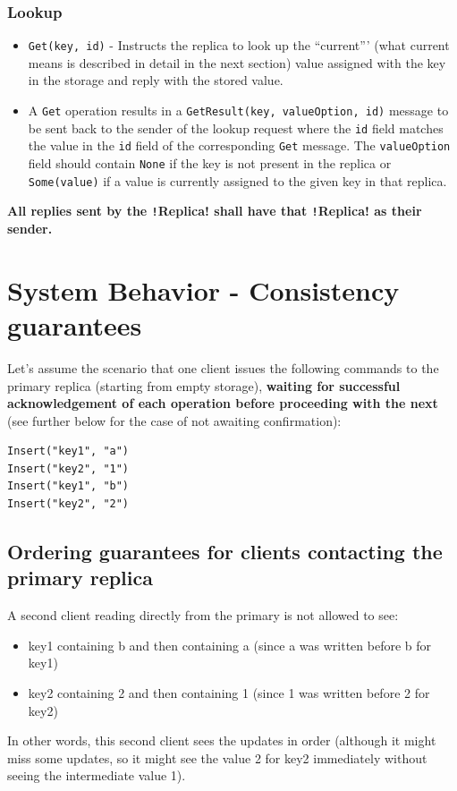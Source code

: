 \documentclass{article}
\begin{document}
 \subsubsection{Lookup} 
 \begin{itemize} 
	 \item \texttt{Get(key, id)} - Instructs the replica to look up the ``current''' (what current means is described in detail in the next section) value assigned with the key in the storage and reply with the stored value. 
	 \item 	 A \texttt{Get} operation results in a \texttt{GetResult(key, valueOption, id)} message to be sent back to the sender of the lookup request where the \texttt{id} field matches the value in the \texttt{id} field of the corresponding \texttt{Get} message. The \texttt{valueOption} field should contain \texttt{None} if the key is not present in the replica or \texttt{Some(value)} if a value is currently assigned to the given key in that replica. 
\end{itemize}
 \textbf{All replies sent by the \texttt!Replica! shall have that \texttt!Replica! as their sender.} 
\section{System Behavior - Consistency guarantees}\label{s:systembehavior}
Let's assume the scenario that one client issues the following commands to the primary replica (starting from empty storage), \textbf{waiting for successful acknowledgement of each operation before proceeding with the next} (see further below for the case of not awaiting confirmation): 
\begin{verbatim}
Insert("key1", "a") 
Insert("key2", "1") 
Insert("key1", "b") 
Insert("key2", "2") 
\end{verbatim}
\subsection{Ordering guarantees for clients contacting the primary replica}\label{ss:orderingguaranteesprimary}
A second client reading directly from the primary is not allowed to see: \begin{itemize} 
\item key1 containing b and then containing a (since a was written before b for key1) 
\item key2 containing 2 and then containing 1 (since 1 was written before 2 for key2) 
\end{itemize} 
In other words, this second client sees the updates in order (although it might miss some updates, so it might see the value 2 for key2 immediately without seeing the intermediate value 1).
\end{document}
